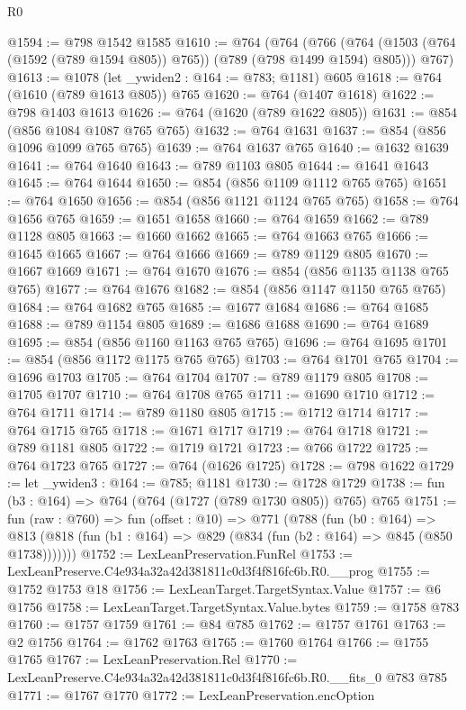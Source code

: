 \begin{lexlean}{R0}
\begin{coremodule}
@1594 := @798 @1542 @1585
@1610 := @764
    (@764
      (@766 (@764 (@1503 (@764 (@1592 (@789 @1594 @805)) @765)) (@789 (@798 @1499 @1594) @805)))
      @767)
@1613 := @1078 (let _ywiden2 : @164 := @783; @1181) @605
@1618 := @764 (@1610 (@789 @1613 @805)) @765
@1620 := @764 (@1407 @1618)
@1622 := @798 @1403 @1613
@1626 := @764 (@1620 (@789 @1622 @805))
@1631 := @854 (@856 @1084 @1087 @765 @765)
@1632 := @764 @1631
@1637 := @854 (@856 @1096 @1099 @765 @765)
@1639 := @764 @1637 @765
@1640 := @1632 @1639
@1641 := @764 @1640
@1643 := @789 @1103 @805
@1644 := @1641 @1643
@1645 := @764 @1644
@1650 := @854 (@856 @1109 @1112 @765 @765)
@1651 := @764 @1650
@1656 := @854 (@856 @1121 @1124 @765 @765)
@1658 := @764 @1656 @765
@1659 := @1651 @1658
@1660 := @764 @1659
@1662 := @789 @1128 @805
@1663 := @1660 @1662
@1665 := @764 @1663 @765
@1666 := @1645 @1665
@1667 := @764 @1666
@1669 := @789 @1129 @805
@1670 := @1667 @1669
@1671 := @764 @1670
@1676 := @854 (@856 @1135 @1138 @765 @765)
@1677 := @764 @1676
@1682 := @854 (@856 @1147 @1150 @765 @765)
@1684 := @764 @1682 @765
@1685 := @1677 @1684
@1686 := @764 @1685
@1688 := @789 @1154 @805
@1689 := @1686 @1688
@1690 := @764 @1689
@1695 := @854 (@856 @1160 @1163 @765 @765)
@1696 := @764 @1695
@1701 := @854 (@856 @1172 @1175 @765 @765)
@1703 := @764 @1701 @765
@1704 := @1696 @1703
@1705 := @764 @1704
@1707 := @789 @1179 @805
@1708 := @1705 @1707
@1710 := @764 @1708 @765
@1711 := @1690 @1710
@1712 := @764 @1711
@1714 := @789 @1180 @805
@1715 := @1712 @1714
@1717 := @764 @1715 @765
@1718 := @1671 @1717
@1719 := @764 @1718
@1721 := @789 @1181 @805
@1722 := @1719 @1721
@1723 := @766 @1722
@1725 := @764 @1723 @765
@1727 := @764 (@1626 @1725)
@1728 := @798 @1622
@1729 := let _ywiden3 : @164 := @785; @1181
@1730 := @1728 @1729
@1738 := fun (b3 : @164) => @764 (@764 (@1727 (@789 @1730 @805)) @765) @765
@1751 := fun (raw : @760) =>
  fun (offset : @10) =>
  @771
    (@788
      (fun (b0 : @164) =>
      @813 (@818 (fun (b1 : @164) => @829 (@834 (fun (b2 : @164) => @845 (@850 @1738)))))))
@1752 := LexLeanPreservation.FunRel
@1753 := LexLeanPreserve.C4e934a32a42d381811c0d3f4f816fc6b.R0.__prog
@1755 := @1752 @1753 @18
@1756 := LexLeanTarget.TargetSyntax.Value
@1757 := @6 @1756
@1758 := LexLeanTarget.TargetSyntax.Value.bytes
@1759 := @1758 @783
@1760 := @1757 @1759
@1761 := @84 @785
@1762 := @1757 @1761
@1763 := @2 @1756
@1764 := @1762 @1763
@1765 := @1760 @1764
@1766 := @1755 @1765
@1767 := LexLeanPreservation.Rel
@1770 := LexLeanPreserve.C4e934a32a42d381811c0d3f4f816fc6b.R0.__fits_0 @783 @785
@1771 := @1767 @1770
@1772 := LexLeanPreservation.encOption

\end{coremodule}
\end{lexlean}

